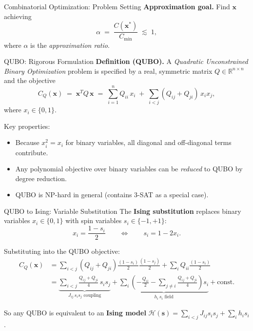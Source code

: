 \documentclass{beamer}
\begin{document}
\begin{frame}
\begin{frame}{Combinatorial Optimization: Problem Setting}
\textbf{Approximation goal.}  Find $\mathbf{x}$ achieving
\[
\alpha \;=\; \frac{C(\mathbf{x}^*)}{C_{\min}} \;\lesssim\; 1,
\]
where $\alpha$ is the \emph{approximation ratio}.
\end{frame}


\begin{frame}{QUBO: Rigorous Formulation}
\textbf{Definition (QUBO).}  A \emph{Quadratic Unconstrained Binary
Optimization} problem is specified by a real, symmetric matrix
$Q\in\mathbb{R}^{n\times n}$ and the objective
\[
\boxed{
C_Q(\mathbf{x}) \;=\; \mathbf{x}^T Q\,\mathbf{x}
\;=\; \sum_{i=1}^n Q_{ii}\,x_i
\;+\; \sum_{i<j}(Q_{ij}+Q_{ji})\,x_i x_j,}
\]
where $x_i\in\{0,1\}$.

Key properties:
\begin{itemize}
\item Because $x_i^2 = x_i$ for binary variables, all diagonal and
  off-diagonal terms contribute.
\item Any polynomial objective over binary variables can be
  \emph{reduced} to QUBO by degree reduction.
\item QUBO is NP-hard in general (contains 3-SAT as a special case).
\end{itemize}
\end{frame}


\begin{frame}{QUBO to Ising: Variable Substitution}
The \textbf{Ising substitution} replaces binary variables
$x_i\in\{0,1\}$ with spin variables $s_i\in\{-1,+1\}$:
\[
x_i = \frac{1 - s_i}{2}
\qquad\Longleftrightarrow\qquad
s_i = 1 - 2x_i.
\]

Substituting into the QUBO objective:
\begin{align*}
C_Q(\mathbf{x})
&= \sum_{i<j}(Q_{ij}+Q_{ji})
   \frac{(1-s_i)}{2}\frac{(1-s_j)}{2}
   + \sum_i Q_{ii}\frac{(1-s_i)}{2}\\[4pt]
&= \underbrace{\sum_{i<j} \frac{Q_{ij}+Q_{ji}}{4}\,s_i s_j}_{J_{ij}\,s_i s_j\text{ coupling}}
   + \underbrace{\sum_i \left(-\frac{Q_{ii}}{2}
   - \sum_{j\neq i}\frac{Q_{ij}+Q_{ji}}{4}\right)s_i}_{h_i\,s_i\text{ field}}
   + \text{const.}
\end{align*}

So any QUBO is equivalent to an \textbf{Ising model}
$\mathcal{H}(\mathbf{s}) = \sum_{i<j}J_{ij}s_is_j + \sum_i h_i s_i$.
\end{frame}


\end{frame}
\end{document}
